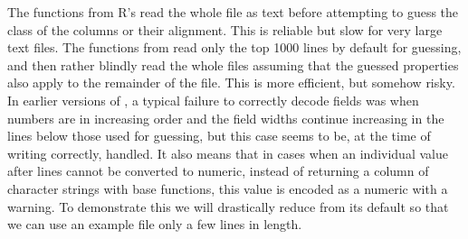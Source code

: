 \documentclass[krantz2]{krantz}\usepackage{knitr}
\begin{document}
\begin{explainbox}
The functions from R's  read the whole file as text before attempting to guess the class of the columns or their alignment. This is reliable but slow for very large text files. The functions from  read only the top 1000 lines by default for guessing, and then rather blindly read the whole files assuming that the guessed properties also apply to the remainder of the file. This is more efficient, but somehow risky. In earlier versions of , a typical failure to correctly decode fields was when numbers are in increasing order and the field widths continue increasing in the lines below those used for guessing, but this case seems to be, at the time of writing correctly, handled. It also means that in cases when an individual value after  lines cannot be converted to numeric, instead of returning a column of character strings with base \Rpgrm functions, this value is encoded as a numeric  with a warning. To demonstrate this we will drastically reduce  from its default so that we can use an example file only a few lines in length.



\begin{knitrout}\footnotesize
{}\color{fgcolor}\begin{kframe}
\begin{alltt}
\hlstd{(} \hlstd{=} \hlstd{)}
\end{alltt}


{\ttfamily\noindent\bfseries\color{errorcolor}{\#\# Error: 'extdata/miss-aligned-ASCII.txt' does not exist in current working directory ('C:/Users/Aphalo/Documents/Own\_manuscripts/Books/learnr-book').}}\end{kframe}
\end{knitrout}

\begin{knitrout}\footnotesize
{}\color{fgcolor}\begin{kframe}
\begin{alltt}
\hlstd{(} \hlstd{=} \hlstd{,}  \hlstd{=} \hlstd{)}
\end{alltt}


{\ttfamily\noindent\bfseries\color{errorcolor}{\#\# Error: 'extdata/miss-aligned-ASCII.txt' does not exist in current working directory ('C:/Users/Aphalo/Documents/Own\_manuscripts/Books/learnr-book').}}\end{kframe}
\end{knitrout}
\end{explainbox}
\end{document}
